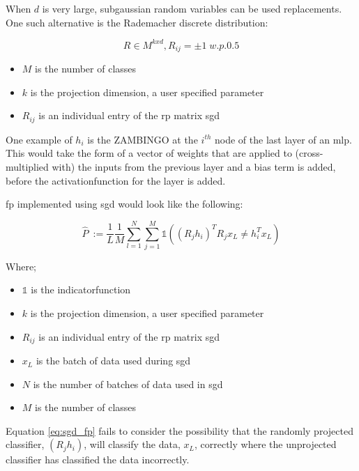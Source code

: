 When $d$ is very large, subgaussian random variables can be used replacements. One such alternative is the Rademacher discrete distribution:

\begin{equation}
R \in M^{kxd}, R_{ij} = \pm 1 \; w.p. 0.5 
\end{equation}

\begin{itemize}
\itemsep-1em 
\item $M$ is the number of classes  
\item $k$ is the projection dimension, a user specified parameter 
\item $R_{ij}$ is an individual entry of the \gls{rp} matrix  \gls{sgd}  
\end{itemize}

One example of $h_i$ is the ZAMBINGO at the $i^{th}$ node of the last layer of an \gls{mlp}. This would take the form of a vector of weights that are applied to (cross-multiplied with) the inputs from the previous layer and a bias term is added, before the \gls{activationfunction} for the layer is added.
\bigskip

\bigskip

\gls{fp} implemented using  \gls{sgd} would look like the following:

\begin{equation}
\label{eq:sgd_fp}
\hat{P}\ := \frac{1}{L}\frac{1}{M}\sum_{l = 1}^N \sum_{j = 1}^M \mathds{1}((R_j h_i)^T R_jx_L \neq h_i^Tx_L)  
\end{equation}

Where;  \smallskip

\begin{itemize}
\itemsep-1em 
\item $\mathds{1}$ is the \gls{indicatorfunction}  
\item $k$ is the projection dimension, a user specified parameter 
\item $R_{ij}$ is an individual entry of the \gls{rp} matrix  \gls{sgd} 
\item $x_L$ is the batch of data used during  \gls{sgd}  
\item $N$ is the number of batches of data used in  \gls{sgd}  
\item $M$ is the number of classes %
\end{itemize}

Equation \ref{eq:sgd_fp} fails to consider the possibility that the randomly projected classifier,  $(R_j h_i)$, will classify the data, $x_L$, correctly where the unprojected classifier has classified the data incorrectly.
\bigskip

